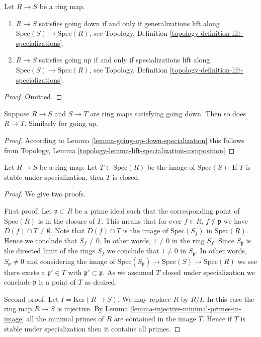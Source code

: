 \begin{lemma}
\label{lemma-going-up-down-specialization}
Let $R \to S$ be a ring map.
\begin{enumerate}
\item $R \to S$ satisfies going down if and only if
generalizations lift along $\text{Spec}(S) \to \text{Spec}(R)$,
see Topology, Definition \ref{topology-definition-lift-specializations}.
\item $R \to S$ satisfies going up if and only if
specializations lift along $\text{Spec}(S) \to \text{Spec}(R)$,
see Topology, Definition \ref{topology-definition-lift-specializations}.
\end{enumerate}
\end{lemma}

\begin{proof}
Omitted.
\end{proof}

\begin{lemma}
\label{lemma-going-up-down-composition}
Suppose $R \to S$ and $S \to T$ are ring maps satisfying
going down. Then so does $R \to T$. Similarly for going up.
\end{lemma}

\begin{proof}
According to Lemma \ref{lemma-going-up-down-specialization}
this follows from 
Topology, Lemma \ref{topology-lemma-lift-specialization-composition}
\end{proof}

\begin{lemma}
\label{lemma-image-stable-specialization-closed}
Let $R \to S$ be a ring map. Let $T \subset \text{Spec}(R)$
be the image of $\text{Spec}(S)$. If $T$ is stable under specialization,
then $T$ is closed.
\end{lemma}

\begin{proof}
We give two proofs.

\medskip\noindent
First proof. Let $\mathfrak p \subset R$ be a prime ideal such that
the corresponding point of $\text{Spec}(R)$ is in the closure
of $T$. This means that for ever $f \in R$, $f \not \in \mathfrak p$
we have $D(f) \cap T \not = \emptyset$. Note that $D(f) \cap T$
is the image of $\text{Spec}(S_f)$ in $\text{Spec}(R)$. Hence
we conclude that $S_f \not = 0$. In other words, $1 \not = 0$ in
the ring $S_f$. Since $S_{\mathfrak p}$ is the directed limit
of the rings $S_f$ we conclude that $1 \not = 0$ in
$S_{\mathfrak p}$. In other words, $S_{\mathfrak p} \not = 0$ and
considering the image of $\text{Spec}(S_{\mathfrak p})
\to \text{Spec}(S) \to \text{Spec}(R)$ we see there exists
a $\mathfrak p' \in T$ with $\mathfrak p' \subset \mathfrak p$.
As we assumed $T$ closed under specialization we conclude $\mathfrak p$
is a point of $T$ as desired.

\medskip\noindent
Second proof. Let $I = \text{Ker}(R \to S)$. We may replace $R$ by $R/I$.
In this case the ring map $R \to S$ is injective.
By Lemma \ref{lemma-injective-minimal-primes-in-image}
all the minimal primes of $R$ are contained in the image $T$. Hence
if $T$ is stable under specialization then it contains all primes.
\end{proof}

